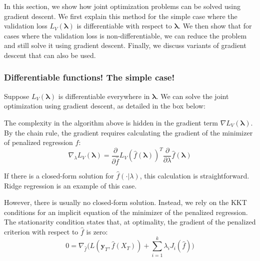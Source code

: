 \documentclass[10pt,letterpaper]{article}
\begin{document}
In this section, we show how joint optimization problems can be solved using gradient descent. We first explain this method for the simple case where the validation loss $L_V(\boldsymbol{\lambda})$ is differentiable with respect to $\boldsymbol{\lambda}$. We then show that for cases where the validation loss is non-differentiable, we can reduce the problem and still solve it using gradient descent. Finally, we discuss variants of gradient descent that can also be used.

\subsubsection{Differentiable functions! The simple case!}

Suppose $L_V(\boldsymbol{\lambda})$ is differentiable everywhere in $\boldsymbol{\lambda}$. We can solve the joint optimization using gradient descent, as detailed in the box below:

\begin{center}
\end{center}
The complexity in the algorithm above is hidden in the gradient term $\nabla{L_V}(\boldsymbol{\lambda})$. By the chain rule, the gradient requires calculating the gradient of the minimizer of penalized regression $\hat f$:
\begin{equation}
\nabla_\lambda{L_V}(\boldsymbol{\lambda}) = \frac{\partial}{\partial \hat f}L_V(\hat f(\boldsymbol{\lambda}))^T \frac{\partial}{\partial \lambda} \hat f(\boldsymbol{\lambda})
\label{chainrule}
\end{equation}

If there is a closed-form solution for $\hat f(\cdot | \lambda)$, this calculation is straightforward. Ridge regression is an example of this case.

However, there is usually no closed-form solution. Instead, we rely on the KKT conditions for an implicit equation of the minimizer of the penalized regression. The stationarity condition states that, at optimality, the gradient of the penalized criterion with respect to $\hat f$ is zero:
\begin{equation}
0 = \nabla_{\hat f} \bigg(L(\boldsymbol y_T, \hat f (X_T)) + \sum\limits_{i=1}^k \lambda_i J_i(\hat f) \bigg)
\label{eq:kktgradient}
\end{equation}
\end{document}
